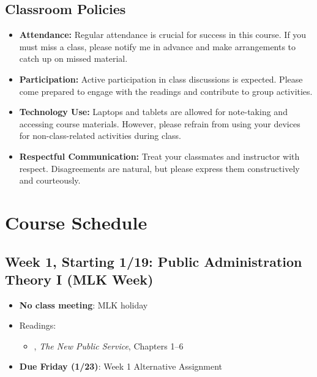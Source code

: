 \documentclass[11pt]{article}     %
\begin{document}
\subsection*{Classroom Policies}
\begin{itemize}
    \item \textbf{Attendance:} Regular attendance is crucial for success in this course. If you must miss a class, please notify me in advance and make arrangements to catch up on missed material.
    \item \textbf{Participation:} Active participation in class discussions is expected. Please come prepared to engage with the readings and contribute to group activities.
    \item \textbf{Technology Use:} Laptops and tablets are allowed for note-taking and accessing course materials. However, please refrain from using your devices for non-class-related activities during class.
    \item \textbf{Respectful Communication:} Treat your classmates and instructor with respect. Disagreements are natural, but please express them constructively and courteously.
\end{itemize}


\section*{Course Schedule}

\subsection*{Week 1, Starting 1/19: Public Administration Theory I (MLK Week)}
\begin{itemize}
    \item \textbf{No class meeting}: MLK holiday
    \item Readings:
    \begin{itemize}
        \item \citet{Denhardt2015}, \emph{The New Public Service}, Chapters 1--6
    \end{itemize}
    \item \textbf{Due Friday (1/23)}: Week 1 Alternative Assignment
\end{itemize}
\end{document}
